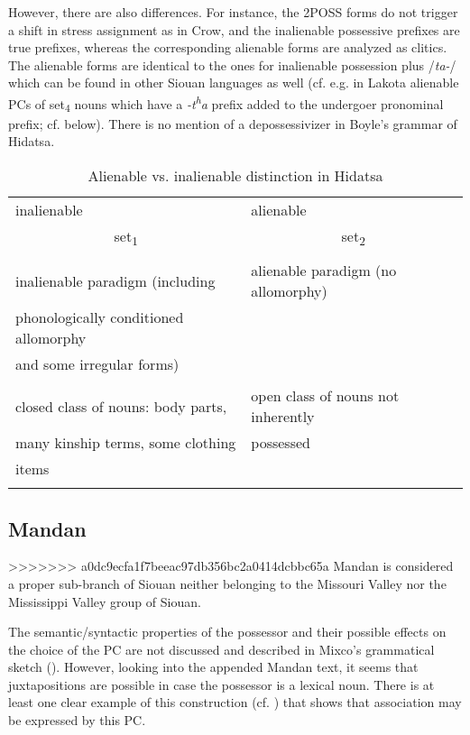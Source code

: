 \documentclass[output=paper]{LSP/langsci}
\begin{document}
However, there are also differences. For instance, the 2POSS forms do not trigger a shift in stress assignment as in Crow, and the inalienable possessive prefixes are true prefixes, whereas the corresponding alienable forms are analyzed as clitics.  The alienable forms are identical to the ones for inalienable possession plus /\textit{ta-}/ which can be found in other Siouan languages as well (cf. e.g. in Lakota alienable PCs of set\textsubscript{4} nouns which have a \textit{-t\textsuperscript{h}a} prefix added to the undergoer pronominal prefix; cf.  below). There is no mention of a depossessivizer in Boyle's grammar of Hidatsa.

\begin{table}
\caption{Alienable vs. inalienable distinction in Hidatsa} \label{hidatsaalienability}
\begin{tabular}{ l l }
\lsptoprule
inalienable & alienable \\
 \multicolumn{1}{c}{set\textsubscript{1}} &  \multicolumn{1}{c}{set\textsubscript{2}} \\
\midrule
&\\
inalienable paradigm (including & alienable paradigm (no allomorphy) \\
phonologically conditioned allomorphy & \\
and some irregular forms) & \\
 & \\
 closed class of nouns: body parts, & open class of nouns not inherently \\
many kinship terms, some clothing &  possessed \\
items & \\
\lspbottomrule
\end{tabular}
\end{table}
 
\subsection{Mandan}\label{sec:helmbrecht:4.3} \label{mandan}
>>>>>>> a0dc9ecfa1f7beeac97db356bc2a0414dcbbc65a
Mandan is considered a proper sub-branch of Siouan neither belonging to the Missouri Valley nor the Mississippi Valley group of Siouan. 

The semantic/syntactic properties of the possessor and their possible effects on the choice of the PC are not discussed and described in Mixco's grammatical sketch (\citealt{Mixco1997a}). However, looking into the appended Mandan text, it seems that juxtapositions are possible in case  the possessor is a lexical noun. There is at least one clear example of this construction (cf. ) that shows that association may be expressed by this PC.
\end{document}

